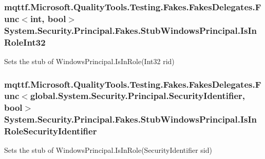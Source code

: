 \hypertarget{class_system_1_1_security_1_1_principal_1_1_fakes_1_1_stub_windows_principal_afcb4a75878785d98c728887bde81405f}{
\subsubsection[{Is\-In\-Role\-Int32}]{\setlength{\rightskip}{0pt plus 5cm}mqttf.\-Microsoft.\-Quality\-Tools.\-Testing.\-Fakes.\-Fakes\-Delegates.\-Func$<$int, bool$>$ System.\-Security.\-Principal.\-Fakes.\-Stub\-Windows\-Principal.\-Is\-In\-Role\-Int32}}\label{class_system_1_1_security_1_1_principal_1_1_fakes_1_1_stub_windows_principal_afcb4a75878785d98c728887bde81405f}


Sets the stub of Windows\-Principal.\-Is\-In\-Role(\-Int32 rid)

\hypertarget{class_system_1_1_security_1_1_principal_1_1_fakes_1_1_stub_windows_principal_ab7e601c0a949603031f93aee8997723c}{
\subsubsection[{Is\-In\-Role\-Security\-Identifier}]{\setlength{\rightskip}{0pt plus 5cm}mqttf.\-Microsoft.\-Quality\-Tools.\-Testing.\-Fakes.\-Fakes\-Delegates.\-Func$<$global.\-System.\-Security.\-Principal.\-Security\-Identifier, bool$>$ System.\-Security.\-Principal.\-Fakes.\-Stub\-Windows\-Principal.\-Is\-In\-Role\-Security\-Identifier}}\label{class_system_1_1_security_1_1_principal_1_1_fakes_1_1_stub_windows_principal_ab7e601c0a949603031f93aee8997723c}


Sets the stub of Windows\-Principal.\-Is\-In\-Role(\-Security\-Identifier sid)

